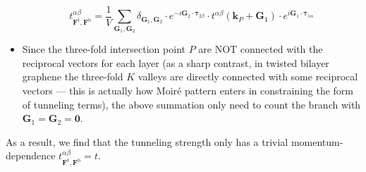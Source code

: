 \begin{subappendices}
\begin{itemize}
		      \begin{equation*}
			      t^{\alpha\beta}_{\bm{F}^{\text{t}},\bm{F}^{\text{b}}}=\dfrac{1}{V}\sum_{\bm{G}_1,\bm{G}_2}\delta_{\bm{G}_1,\bm{G}_2}\cdot e^{-i\bm{G}_2\cdot\bm{\tau}_{2\beta}}\cdot t^{\alpha\beta}(\bm{k}_P+\bm{G}_1)\cdot e^{i\bm{G}_1\cdot\bm{\tau}_{1 \alpha}}
		      \end{equation*}
		\item Since the three-fold intersection point $P$ are NOT connected with the reciprocal vectors for each layer (as a sharp contrast, in twisted bilayer graphene the three-fold $K$ valleys are directly connected with some reciprocal vectors --- this is actually how Moir\'{e} pattern enters in constraining the form of tunneling terms), the above summation only need to count the branch with $\bm{G}_1=\bm{G}_2=\bm{0}$.
	\end{itemize}
	As a result, we find that the tunneling strength only has a trivial momentum-dependence $t^{\alpha\beta}_{\bm{F}^{\text{t}},\bm{F}^{\text{b}}}=t$.\label{app:two-center approximation}

\end{subappendices}